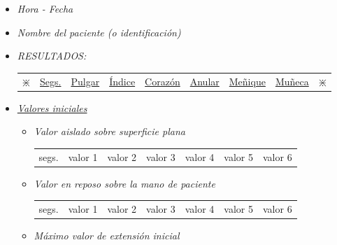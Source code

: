 \begin{itemize} [label=]
	\begin{itemize} [label=$ \rhd $] \addtolength{\itemsep}{-4mm} %
		\item \textit{Hora - Fecha}
		\item \textit{Nombre del paciente (o identificación)}
		\item \textit{RESULTADOS:}\vspace{-6mm}
			\begin{table}[H]
				\hspace{1cm} %
				\renewcommand{\arraystretch}{2}
				\begin{tabular}{ccccccccc}
					$ \divideontimes $ & \underline{Segs.} & \underline{Pulgar} & \underline{Índice} & \underline{Corazón} & \underline{Anular} & \underline{Meñique} & \underline{Muñeca} & $ \divideontimes $  \\
				\end{tabular} 
			\end{table}
		\vspace{-6mm}
		\item \textit{\underline{Valores iniciales}}
		\begin{itemize} [label= $  \triangleright $] \addtolength{\itemsep}{-5mm} %
			\item \textit{Valor aislado sobre superficie plana}	\vspace{-6mm}
				\begin{table}[H]
					\hspace{2cm}
					\renewcommand{\arraystretch}{2}
					\begin{tabular}{ccccccc}
						segs.& valor 1 & valor 2 & valor 3 & valor 4 & valor 5 & valor 6  \\
					\end{tabular} 
				\end{table}			
			\item \textit{Valor en reposo sobre la mano de paciente} \vspace{-6mm}
				\begin{table}[H]
					\hspace{2cm}
					\renewcommand{\arraystretch}{2}
					\begin{tabular}{ccccccc}
						segs.& valor 1 & valor 2 & valor 3 & valor 4 & valor 5 & valor 6  \\
					\end{tabular} 
				\end{table}	
			\item \textit{Máximo valor de extensión inicial} \vspace{-6mm}

\end{itemize}
\end{itemize}
\end{itemize}
